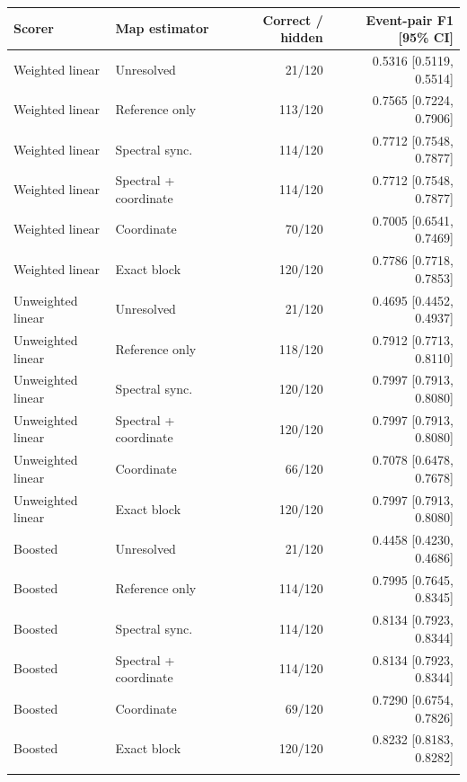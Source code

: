 \begin{tabularx}{\linewidth}{@{}lYrr@{}}\toprule
Scorer & Map estimator & Correct / hidden & Event-pair F1 [95\% CI] \\\midrule
Weighted linear & Unresolved & 21/120 & 0.5316 [0.5119, 0.5514] \\
Weighted linear & Reference only & 113/120 & 0.7565 [0.7224, 0.7906] \\
Weighted linear & Spectral sync. & 114/120 & 0.7712 [0.7548, 0.7877] \\
Weighted linear & Spectral + coordinate & 114/120 & 0.7712 [0.7548, 0.7877] \\
Weighted linear & Coordinate & 70/120 & 0.7005 [0.6541, 0.7469] \\
Weighted linear & Exact block & 120/120 & 0.7786 [0.7718, 0.7853] \\
\addlinespace
Unweighted linear & Unresolved & 21/120 & 0.4695 [0.4452, 0.4937] \\
Unweighted linear & Reference only & 118/120 & 0.7912 [0.7713, 0.8110] \\
Unweighted linear & Spectral sync. & 120/120 & 0.7997 [0.7913, 0.8080] \\
Unweighted linear & Spectral + coordinate & 120/120 & 0.7997 [0.7913, 0.8080] \\
Unweighted linear & Coordinate & 66/120 & 0.7078 [0.6478, 0.7678] \\
Unweighted linear & Exact block & 120/120 & 0.7997 [0.7913, 0.8080] \\
\addlinespace
Boosted & Unresolved & 21/120 & 0.4458 [0.4230, 0.4686] \\
Boosted & Reference only & 114/120 & 0.7995 [0.7645, 0.8345] \\
Boosted & Spectral sync. & 114/120 & 0.8134 [0.7923, 0.8344] \\
Boosted & Spectral + coordinate & 114/120 & 0.8134 [0.7923, 0.8344] \\
Boosted & Coordinate & 69/120 & 0.7290 [0.6754, 0.7826] \\
Boosted & Exact block & 120/120 & 0.8232 [0.8183, 0.8282] \\
\addlinespace
\bottomrule\end{tabularx}

